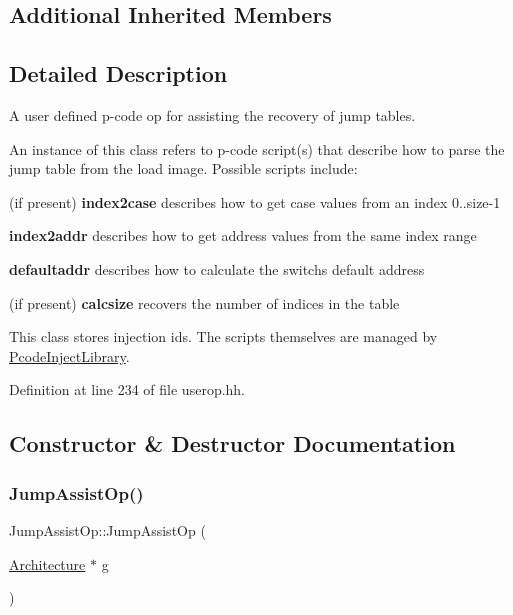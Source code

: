 \subsection*{Additional Inherited Members}


\subsection{Detailed Description}
A user defined p-\/code op for assisting the recovery of jump tables. 

An instance of this class refers to p-\/code script(s) that describe how to parse the jump table from the load image. Possible scripts include\+:
\begin{DoxyItemize}
\item (if present) {\bfseries{index2case}} describes how to get case values from an index 0..size-\/1
\item {\bfseries{index2addr}} describes how to get address values from the same index range
\item {\bfseries{defaultaddr}} describes how to calculate the switch\textquotesingle{}s default address
\item (if present) {\bfseries{calcsize}} recovers the number of indices in the table
\end{DoxyItemize}

This class stores injection ids. The scripts themselves are managed by \mbox{\hyperlink{class_pcode_inject_library}{Pcode\+Inject\+Library}}. 

Definition at line 234 of file userop.\+hh.



\subsection{Constructor \& Destructor Documentation}
\mbox{\label{class_jump_assist_op_a78d4877f371694b4f9526564b29ebbe5}} 
\subsubsection{\texorpdfstring{JumpAssistOp()}{JumpAssistOp()}}
{\footnotesize\ttfamily Jump\+Assist\+Op\+::\+Jump\+Assist\+Op (\begin{DoxyParamCaption}\item[{\mbox{\hyperlink{class_architecture}{Architecture}} $\ast$}]{g }\end{DoxyParamCaption})}



